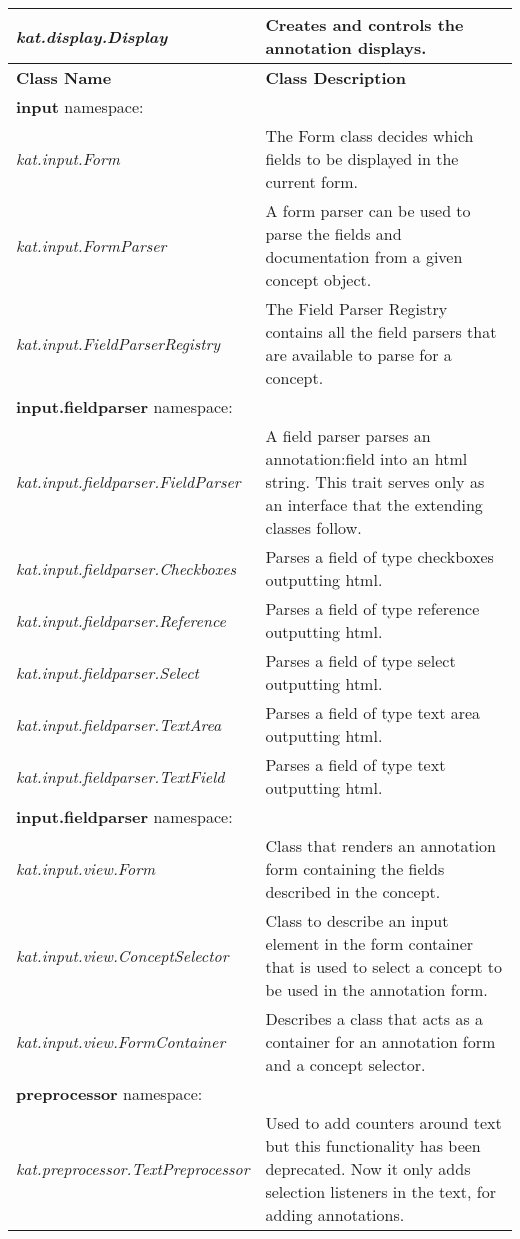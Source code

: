\begin{longtable}{p{6cm}|p{8cm}}
 \textit{kat.display.Display} & Creates and controls the annotation displays.\\\hline
 \large{\textbf{Class Name}} & \large{\textbf{Class Description}}\\\hline
 \textbf{input} namespace: \\\hline
 \textit{kat.input.Form} & The Form class decides which fields to be displayed in the current form. \\\hline
 \textit{kat.input.FormParser} & A form parser can be used to parse the fields and documentation from a given concept object.\\\hline
 \textit{kat.input.FieldParserRegistry} & The Field Parser Registry contains all the field parsers that are available to parse for a concept.\\\hline
 \textbf{input.fieldparser} namespace: \\\hline
 \textit{kat.input.fieldparser.FieldParser} & A field parser parses an annotation:field into an html string. This trait serves only as an interface that the extending classes follow. \\\hline
 \textit{kat.input.fieldparser.Checkboxes} & Parses a field of type checkboxes outputting html. \\\hline
 \textit{kat.input.fieldparser.Reference} & Parses a field of type reference outputting html. \\\hline
 \textit{kat.input.fieldparser.Select} & Parses a field of type select outputting html. \\\hline
 \textit{kat.input.fieldparser.TextArea} & Parses a field of type text area outputting html. \\\hline
 \textit{kat.input.fieldparser.TextField} & Parses a field of type text outputting html. \\\hline
 \textbf{input.fieldparser} namespace: \\\hline
 \textit{kat.input.view.Form} & Class that renders an annotation form containing the fields described in the concept. \\\hline
 \textit{kat.input.view.ConceptSelector} & Class to describe an input element in the form container that is used to select a concept to be used in the annotation form.\\\hline
 \textit{kat.input.view.FormContainer} & Describes a class that acts as a container for an annotation form and a concept selector.\\\hline
 \textbf{preprocessor} namespace: \\\hline
 \textit{kat.preprocessor.TextPreprocessor} & Used to add counters around text but this functionality has been deprecated. Now it only adds selection listeners in the text, for adding annotations.\\\hline

\end{longtable}
